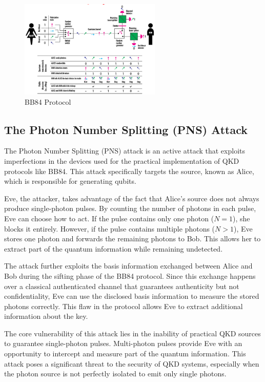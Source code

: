 \begin{figure}[H]
  \centering
  \includegraphics[width=0.6\textwidth]{img/bb84.png}
  \caption{BB84 Protocol}
\end{figure}

\subsection{The Photon Number Splitting (PNS) Attack}

The Photon Number Splitting (PNS) attack is an active attack that
exploits imperfections in the devices used for the practical
implementation of QKD protocols like BB84. This attack specifically
targets the source, known as Alice, which is responsible for
generating qubits.

Eve, the attacker, takes advantage of the fact that Alice's source
does not always produce single-photon pulses. By counting the number
of photons in each pulse, Eve can choose how to act. If the pulse
contains only one photon (\(N = 1\)), she blocks it entirely. However,
if the pulse contains multiple photons (\(N > 1\)), Eve stores one
photon and forwards the remaining photons to Bob. This allows her to
extract part of the quantum information while remaining undetected.

The attack further exploits the basis information exchanged between
Alice and Bob during the sifting phase of the BB84 protocol. Since
this exchange happens over a classical authenticated channel that
guarantees authenticity but not confidentiality, Eve can use the
disclosed basis information to measure the stored photons correctly.
This flaw in the protocol allows Eve to extract additional information
about the key.

The core vulnerability of this attack lies in the inability of
practical QKD sources to guarantee single-photon pulses. Multi-photon
pulses provide Eve with an opportunity to intercept and measure part
of the quantum information. This attack poses a significant threat to
the security of QKD systems, especially when the photon source is not
perfectly isolated to emit only single photons.

